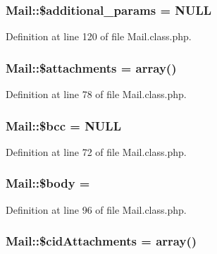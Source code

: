 \subsubsection[{\texorpdfstring{\$additional\+\_\+params}{$additional_params}}]{\setlength{\rightskip}{0pt plus 5cm}Mail\+::\$additional\+\_\+params = N\+U\+LL}\hypertarget{classMail_a38466de017089677f088c9a4025f724f}{}\label{classMail_a38466de017089677f088c9a4025f724f}


Definition at line 120 of file Mail.\+class.\+php.

\subsubsection[{\texorpdfstring{\$attachments}{$attachments}}]{\setlength{\rightskip}{0pt plus 5cm}Mail\+::\$attachments = array()}\hypertarget{classMail_a93b05b1003cc8ea16b59c00d77f47466}{}\label{classMail_a93b05b1003cc8ea16b59c00d77f47466}


Definition at line 78 of file Mail.\+class.\+php.

\subsubsection[{\texorpdfstring{\$bcc}{$bcc}}]{\setlength{\rightskip}{0pt plus 5cm}Mail\+::\$bcc = N\+U\+LL}\hypertarget{classMail_a2e25b3c43459422d40765d581b165692}{}\label{classMail_a2e25b3c43459422d40765d581b165692}


Definition at line 72 of file Mail.\+class.\+php.

\subsubsection[{\texorpdfstring{\$body}{$body}}]{\setlength{\rightskip}{0pt plus 5cm}Mail\+::\$body = \textquotesingle{}\textquotesingle{}}\hypertarget{classMail_acbd542849121b33a76ed63e1c4670e02}{}\label{classMail_acbd542849121b33a76ed63e1c4670e02}


Definition at line 96 of file Mail.\+class.\+php.

\subsubsection[{\texorpdfstring{\$cid\+Attachments}{$cidAttachments}}]{\setlength{\rightskip}{0pt plus 5cm}Mail\+::\$cid\+Attachments = array()}\hypertarget{classMail_a66c6752b550e4e8fd79a63b62815f48f}{}\label{classMail_a66c6752b550e4e8fd79a63b62815f48f}


